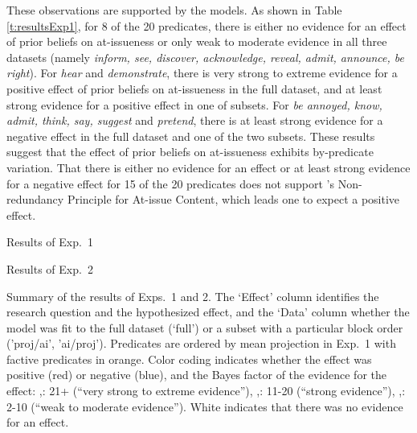\documentclass[11pt,fleqn]{article}
\newcommand{\6}{\mbox{$[\hspace*{-.6mm}[$}}
\newcommand{\9}{\mbox{$]\hspace*{-.6mm}]$}}
\newcommand{\citepos}[1]{\citeauthor{#1}'s \citeyear{#1}}
\begin{document}
These observations are supported by the models. As shown in Table \ref{t:resultsExp1}, for 8 of the 20 predicates, there is either no evidence for an effect of prior beliefs on at-issueness or only weak to moderate evidence in all three datasets (namely {\em inform, see, discover, acknowledge, reveal, admit, announce, be right}). For {\em hear} and {\em demonstrate}, there is very strong to extreme evidence for a positive effect of prior beliefs on at-issueness in the full dataset, and at least strong evidence for a positive effect in one of subsets. For {\em be annoyed, know, admit, think, say, suggest} and {\em pretend}, there is at least strong evidence for a negative effect in the full dataset and one of the two subsets. These results suggest that the effect of prior beliefs on at-issueness exhibits by-predicate variation. That there is either no evidence for an effect or at least strong evidence for a negative effect for 15 of the 20 predicates does not support \citepos{tonhauser-etal-eval} Non-redundancy Principle for At-issue Content, which leads one to expect a positive effect.


\setlength{\fboxrule}{0pt}

\begin{table}[h!]
\begin{subtable}[h]{1\textwidth}
\setlength{\tabcolsep}{3pt}
\centering

\caption{Results of Exp.~1}\label{t:resultsExp1}
\end{subtable}

\vspace*{.4cm}

\begin{subtable}[h]{1\textwidth}
\setlength{\tabcolsep}{3.5pt}
\centering

\caption{Results of Exp.~2}\label{t:resultsExp2}
\end{subtable}

\caption{Summary of the results of Exps.~1 and 2. The `Effect' column identifies the research question and the hypothesized effect, and the `Data' column whether the model was fit to the full dataset (`full') or a subset with a particular block order ('proj/ai', 'ai/proj'). Predicates are ordered by mean projection in Exp.~1 with factive predicates in \color{orange}orange\color{black}. Color coding indicates whether the effect was positive (red) or negative (blue), and the Bayes factor of the evidence for the effect: \colorbox{red1}{\makebox[1em][c]{\framebox[1em]{\rule{0pt}{3pt}}}},\colorbox{blue1}{\makebox[1em][c]{\framebox[1em]{\rule{0pt}{3pt}}}}: 21+ (``very strong to extreme evidence''), 
\colorbox{red2}{\makebox[1em][c]{\framebox[1em]{\rule{0pt}{3pt}}}},\colorbox{blue2}{\makebox[1em][c]{\framebox[1em]{\rule{0pt}{3pt}}}}: 11-20 (``strong evidence''), 
\colorbox{red4}{\makebox[1em][c]{\framebox[1em]{\rule{0pt}{3pt}}}},\colorbox{blue4}{\makebox[1em][c]{\framebox[1em]{\rule{0pt}{3pt}}}}: 2-10 (``weak to moderate evidence'').
White indicates that there was no evidence for an effect. 
}

\end{table}
\end{document}
